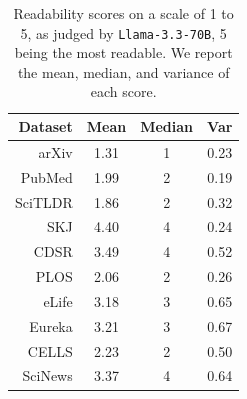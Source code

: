 \begin{table}[t]
\centering \footnotesize
\begin{tabular}{r|ccc}
Dataset & Mean & Median & Var \\ \hline
arXiv & 1.31 & 1 & 0.23 \\
PubMed & 1.99 & 2 & 0.19 \\
SciTLDR & 1.86 & 2 & 0.32 \\
SKJ & 4.40 & 4 & 0.24 \\ 
CDSR & 3.49 & 4 & 0.52 \\
PLOS & 2.06 & 2 & 0.26 \\
eLife & 3.18 & 3 & 0.65 \\
Eureka & 3.21 & 3 & 0.67 \\
CELLS & 2.23 & 2 & 0.50 \\
SciNews & 3.37 & 4 & 0.64
\end{tabular}
\vspace{-2mm}
\caption[LM readability scores on a scale of 1 to 5.]{Readability scores on a scale of 1 to 5, as judged by \texttt{Llama-3.3-70B}, 5 being the most readable. We report the mean, median, and variance of each score.}\label{tab:lm-readability-scores-by-dataset}
\vspace{-4mm}
\end{table}